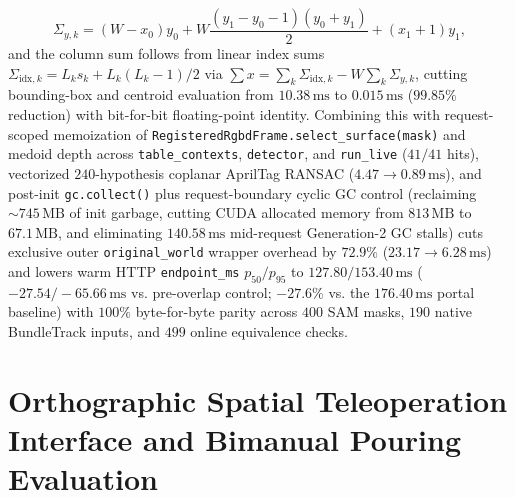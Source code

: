 \documentclass[10pt,journal]{IEEEtran}
\begin{document}
\begin{enumerate}
    \begin{equation}
        \Sigma_{y,k} = (W - x_0)y_0 + W\frac{(y_1 - y_0 - 1)(y_0 + y_1)}{2} + (x_1 + 1)y_1,
        \label{eq:monograph_rle_sum_y}
    \end{equation}
    and the column sum follows from linear index sums $\Sigma_{\mathrm{idx},k} = L_k s_k + L_k(L_k - 1)/2$ via $\sum x = \sum_k \Sigma_{\mathrm{idx},k} - W\sum_k \Sigma_{y,k}$, cutting bounding-box and centroid evaluation from $10.38\,\mathrm{ms}$ to $0.015\,\mathrm{ms}$ ($99.85\%$ reduction) with bit-for-bit floating-point identity. Combining this with request-scoped memoization of \texttt{RegisteredRgbdFrame.select\_surface(mask)} and medoid depth across \texttt{table\_contexts}, \texttt{detector}, and \texttt{run\_live} ($41/41$ hits), vectorized $240$-hypothesis coplanar AprilTag RANSAC ($4.47 \to 0.89\,\mathrm{ms}$), and post-init \texttt{gc.collect()} plus request-boundary cyclic GC control (reclaiming $\sim 745\,\mathrm{MB}$ of init garbage, cutting CUDA allocated memory from $813\,\mathrm{MB}$ to $67.1\,\mathrm{MB}$, and eliminating $140.58\,\mathrm{ms}$ mid-request Generation-2 GC stalls) cuts exclusive outer \texttt{original\_world} wrapper overhead by $\mathbf{72.9\%}$ ($23.17 \to 6.28\,\mathrm{ms}$) and lowers warm HTTP \texttt{endpoint\_ms} $p_{50}/p_{95}$ to $\mathbf{127.80 / 153.40\,\mathrm{ms}}$ ($\mathbf{-27.54 / -65.66\,\mathrm{ms}}$ vs. pre-overlap control; $\mathbf{-27.6\%}$ vs. the $176.40\,\mathrm{ms}$ portal baseline) with $100\%$ byte-for-byte parity across $400$ SAM masks, $190$ native BundleTrack inputs, and $499$ online equivalence checks.
\end{enumerate}

\section{Orthographic Spatial Teleoperation Interface and Bimanual Pouring Evaluation}
\label{sec:ui}
\end{document}

